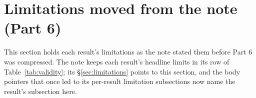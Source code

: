 \section{Limitations moved from the note (Part 6)}
This section holds each result's limitations as the note stated them before Part 6 was compressed. The note keeps each result's headline limits in its row of Table~\ref{tab:validity}; its \S\ref{sec:limitations} points to this section, and the body pointers that once led to its per-result limitation subsections now name the result's subsection here.

